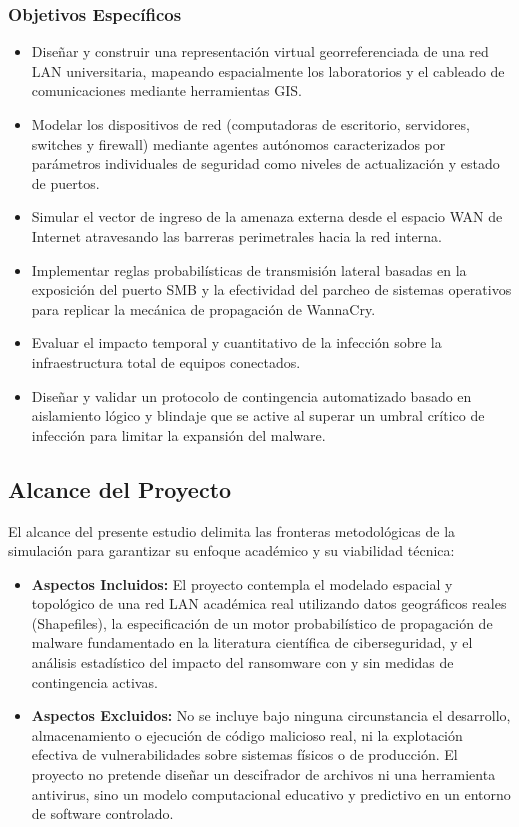 \subsubsection{Objetivos Específicos}
\begin{itemize}
    \item Diseñar y construir una representación virtual georreferenciada de una red LAN universitaria, mapeando espacialmente los laboratorios y el cableado de comunicaciones mediante herramientas GIS.
    \item Modelar los dispositivos de red (computadoras de escritorio, servidores, switches y firewall) mediante agentes autónomos caracterizados por parámetros individuales de seguridad como niveles de actualización y estado de puertos.
    \item Simular el vector de ingreso de la amenaza externa desde el espacio WAN de Internet atravesando las barreras perimetrales hacia la red interna.
    \item Implementar reglas probabilísticas de transmisión lateral basadas en la exposición del puerto SMB y la efectividad del parcheo de sistemas operativos para replicar la mecánica de propagación de WannaCry.
    \item Evaluar el impacto temporal y cuantitativo de la infección sobre la infraestructura total de equipos conectados.
    \item Diseñar y validar un protocolo de contingencia automatizado basado en aislamiento lógico y blindaje que se active al superar un umbral crítico de infección para limitar la expansión del malware.
\end{itemize}

\subsection{Alcance del Proyecto}
El alcance del presente estudio delimita las fronteras metodológicas de la simulación para garantizar su enfoque académico y su viabilidad técnica:

\begin{itemize}
    \item \textbf{Aspectos Incluidos:} El proyecto contempla el modelado espacial y topológico de una red LAN académica real utilizando datos geográficos reales (Shapefiles), la especificación de un motor probabilístico de propagación de malware fundamentado en la literatura científica de ciberseguridad, y el análisis estadístico del impacto del ransomware con y sin medidas de contingencia activas.
    \item \textbf{Aspectos Excluidos:} No se incluye bajo ninguna circunstancia el desarrollo, almacenamiento o ejecución de código malicioso real, ni la explotación efectiva de vulnerabilidades sobre sistemas físicos o de producción. El proyecto no pretende diseñar un descifrador de archivos ni una herramienta antivirus, sino un modelo computacional educativo y predictivo en un entorno de software controlado.
\end{itemize}

